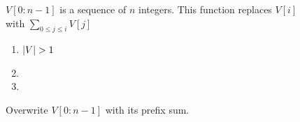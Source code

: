 \begin{figure*}[h!]
\begin{minipage}{\textwidth}
\begin{center}
{\begin{minipage}{\textwidth}
{                        \noindent
                        {\color{gray} ${V}[0:n-1]$ is a sequence of $n$ integers.  This function replaces $V[i]$ with $\sum_{0\leq j \leq i}{V[j]}$}
                        \noindent
                        \begin{enumerate}
                            \item \xif $\left|V\right| > 1$ \xthen
                            \item \T {}
                            \item \T {}
                        \end{enumerate}
                    }
                \end{minipage}
            }
            \vspace{-0.3cm}
            \caption{Overwrite $V[0:n-1]$ with its prefix sum.}
            \label{fi:score-one-fold}
            \vspace{-0.3cm}
        \end{center}
    \end{minipage}
\end{figure*}

